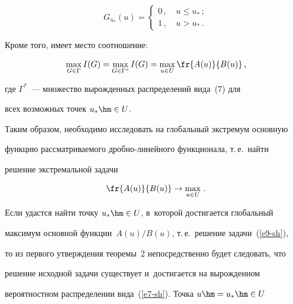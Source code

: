   \begin{equation}

  G_{u_*}(u) =

  \begin{cases} 0\,, &\ u\leq u_*\,;\\

  1\,, &\ u>u_*\,.

  \end{cases}

  \label{e7-sh}

  \end{equation}

  Кроме того, имеет место соотношение:

  \begin{equation*}

  \max\limits_{G\in \Gamma} I(G) = \max\limits_{G\in \Gamma^*} 

I(G)=\max\limits_{u\in U} \fr{A(u)}{B(u)}\,,


  \end{equation*}

  где $\Gamma^*$~--- множество вырожденных распределений вида~(7) для 

всех возможных точек $u_*\hm\in U$.



  Таким образом, необходимо исследовать на глобальный экстремум основную 

функцию рассматриваемого дроб\-но-ли\-ней\-но\-го функционала, т.\,е.\ найти 

решение экстремальной задачи

  \begin{equation}

  \fr{A(u)}{B(u)} \to \max\limits_{u\in U}\,.

  \label{e9-sh}

  \end{equation}

  

  Если удастся найти точку $u_*\hm\in U$, в~которой достигается глобальный 

максимум основной функции~$A(u)/B(u)$, т.\,е.\ решение задачи~(\ref{e9-sh}), 

то из первого утверждения теоремы~2 непосредственно будет следовать, что 

решение исходной задачи существует и~достигается на вырожденном 

вероятностном распределении вида~(\ref{e7-sh}). Точка $u\hm= u_*\hm\in U$ 

